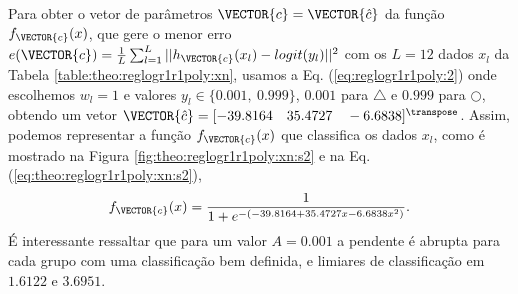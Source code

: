 \begin{SolutionT}\label{sol:theo:reglogr1r1poly:s2}
Para obter o vetor de parâmetros $\VECTOR{c}=\VECTOR{\hat{c}}$ da função $f_{\VECTOR{c}}(x)$, 
que gere o menor erro $e(\VECTOR{c}) =  \frac{1}{L} \sum_{l=1}^{L} ||h_{\VECTOR{c}}(x_l)-logit(y_l)||^2$
com os $L=12$ dados $x_l$ da Tabela \ref{table:theo:reglogr1r1poly:xn},
usamos a Eq. (\ref{eq:reglogr1r1poly:2}) onde escolhemos $w_l=1$ e valores $y_l \in \{0.001,~ 0.999\}$,
$0.001$ para $\bigtriangleup$ e $0.999$ para $\bigcirc$,
obtendo um vetor $\VECTOR{\hat{c}}=[-39.8164\quad 35.4727\quad -6.6838]^{\transpose}$. 
Assim, podemos representar a função $f_{\VECTOR{c}}(x)$ que classifica os dados $x_l$, 
como é mostrado na Figura \ref{fig:theo:reglogr1r1poly:xn:s2} e na Eq. (\ref{eq:theo:reglogr1r1poly:xn:s2}),
\begin{equation}\label{eq:theo:reglogr1r1poly:xn:s2}
f_{\VECTOR{c}}(x)= \frac{1}{1+e^{-(-39.8164+35.4727 x -6.6838 x^2)}}.
\end{equation}
É interessante ressaltar que para um valor $A=0.001$ a pendente é abrupta para cada grupo com uma classificação bem definida,
e limiares de classificação em $1.6122$ e $3.6951$.
\end{SolutionT}
